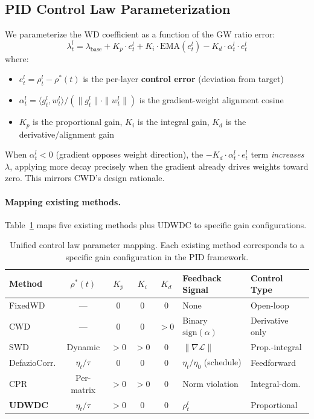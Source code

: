 \documentclass{article}
\begin{document}
\subsection{PID Control Law Parameterization}

We parameterize the WD coefficient as a function of the GW ratio error:
\begin{equation}
\lambda_t^l = \lambda_{\text{base}} + K_p \cdot e_t^l + K_i \cdot \text{EMA}(e_t^l) - K_d \cdot \alpha_t^l \cdot e_t^l
\label{eq:pid}
\end{equation}
where:
\begin{itemize}
\item $e_t^l = \rho_t^l - \rho^*(t)$ is the per-layer \textbf{control error} (deviation from target)
\item $\alpha_t^l = \langle g_t^l, w_t^l \rangle / (\|g_t^l\| \cdot \|w_t^l\|)$ is the gradient-weight alignment cosine
\item $K_p$ is the proportional gain, $K_i$ is the integral gain, $K_d$ is the derivative/alignment gain
\end{itemize}

When $\alpha_t^l < 0$ (gradient opposes weight direction), the $-K_d \cdot \alpha_t^l \cdot e_t^l$ term \emph{increases} $\lambda$, applying more decay precisely when the gradient already drives weights toward zero. This mirrors CWD's design rationale.

\paragraph{Mapping existing methods.}
Table~\ref{tab:pid_mapping} maps five existing methods plus UDWDC to specific gain configurations.

\begin{table}[t]
\caption{Unified control law parameter mapping. Each existing method corresponds to a specific gain configuration in the PID framework.}
\label{tab:pid_mapping}
\centering
\small
\begin{tabular}{lccccll}
\toprule
Method & $\rho^*(t)$ & $K_p$ & $K_i$ & $K_d$ & Feedback Signal & Control Type \\
\midrule
FixedWD & --- & 0 & 0 & 0 & None & Open-loop \\
CWD & --- & 0 & 0 & $>0$ & Binary $\text{sign}(\alpha)$ & Derivative only \\
SWD & Dynamic & $>0$ & $>0$ & 0 & $\|\nabla\mathcal{L}\|$ & Prop.-integral \\
DefazioCorr. & $\eta_t/\tau$ & 0 & 0 & 0 & $\eta_t/\eta_0$ (schedule) & Feedforward \\
CPR & Per-matrix & $>0$ & $>0$ & 0 & Norm violation & Integral-dom. \\
\textbf{UDWDC} & $\eta_t/\tau$ & $>0$ & 0 & 0 & $\rho_t^l$ & Proportional \\
\bottomrule
\end{tabular}
\end{table}
\end{document}
